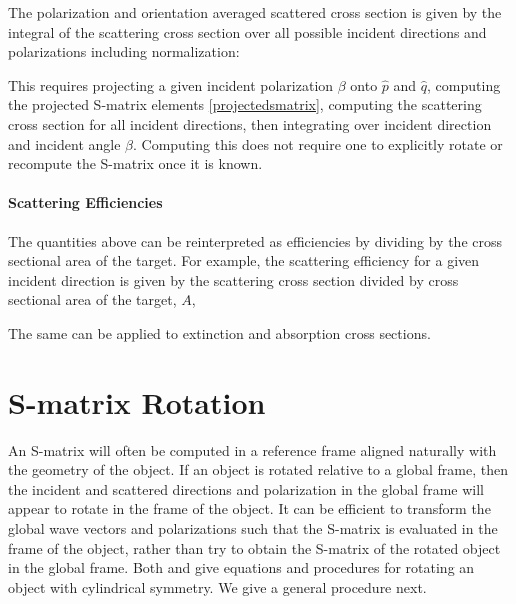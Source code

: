 The polarization and orientation averaged scattered cross section is given by the integral of the scattering cross section over all possible incident directions and polarizations including normalization:

This requires projecting a given incident polarization $\beta$ onto $\hat{p}$ and $\hat{q}$, computing the projected S-matrix elements \eqref{projectedsmatrix}, computing the scattering cross section for all incident directions, then integrating over incident direction and incident angle $\beta$. Computing this does not require one to explicitly rotate or recompute the S-matrix once it is known.


\paragraph{Scattering Efficiencies} The quantities above can be reinterpreted as efficiencies by dividing by the cross sectional area of the target.  For example, the scattering efficiency for a given incident direction is given by the scattering cross section divided by cross sectional area of the target, $A$,  


The same can be applied to extinction and absorption cross sections.  

\section{S-matrix Rotation}

An S-matrix will often be computed in a reference frame aligned naturally with the geometry of the object. If an object is rotated relative to a global frame, then the incident and scattered directions and polarization in the global frame will appear to rotate in the frame of the object. It can be efficient to transform the global wave vectors and polarizations such that the S-matrix is evaluated in the frame of the object, rather than try to obtain the S-matrix of the rotated object in the global frame. Both \cite{tsang2000scattering} and \cite{van2011synthetic} give equations and procedures for rotating an object with cylindrical symmetry. We give a general procedure next.

